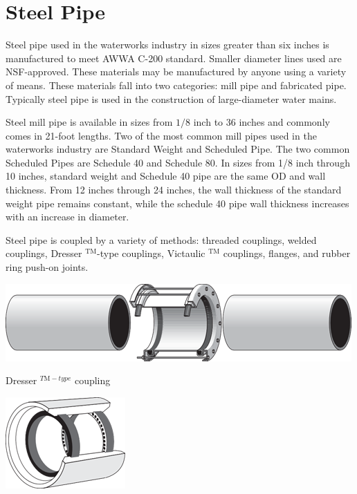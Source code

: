 \documentclass[10pt]{article}
\begin{document}
\section{Steel Pipe}
Steel pipe used in the waterworks industry in sizes greater than six inches is manufactured to meet AWWA C-200 standard. Smaller diameter lines used are NSF-approved. These materials may be manufactured by anyone using a variety of means. These materials fall into two categories: mill pipe and fabricated pipe. Typically steel pipe is used in the construction of large-diameter water mains.

Steel mill pipe is available in sizes from $1 / 8$ inch to 36 inches and commonly comes in 21-foot lengths. Two of the most common mill pipes used in the waterworks industry are Standard Weight and Scheduled Pipe. The two common Scheduled Pipes are Schedule 40 and Schedule 80. In sizes from 1/8 inch through 10 inches, standard weight and Schedule 40 pipe are the same OD and wall thickness. From 12 inches through 24 inches, the wall thickness of the standard weight pipe remains constant, while the schedule 40 pipe wall thickness increases with an increase in diameter.

Steel pipe is coupled by a variety of methods: threaded couplings, welded couplings, Dresser ${ }^{\mathrm{TM}}$-type couplings, Victaulic ${ }^{\mathrm{TM}}$ couplings, flanges, and rubber ring push-on joints.

\includegraphics[max width=\textwidth]{DresserCoupling}

Dresser ${ }^{T \mathrm{M}-t y p e}$ coupling

\includegraphics[max width=\textwidth]{DoubleBellCoupling}
\end{document}
